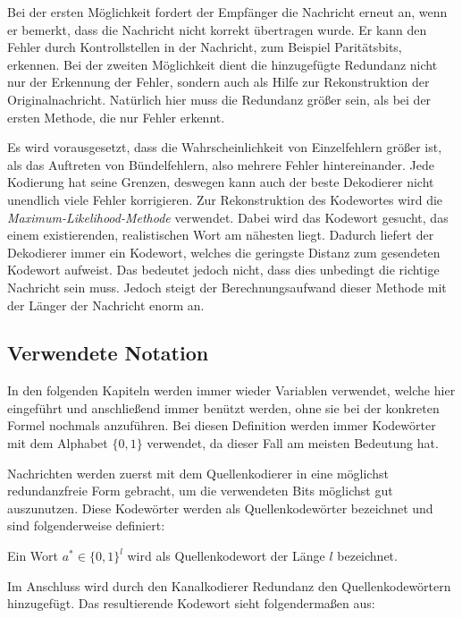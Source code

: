 Bei der ersten Möglichkeit fordert der Empfänger die Nachricht erneut an, wenn er bemerkt, dass die Nachricht nicht korrekt übertragen wurde. Er kann den Fehler durch Kontrollstellen in der Nachricht, zum Beispiel Paritätsbits, erkennen. Bei der zweiten Möglichkeit dient die hinzugefügte Redundanz nicht nur der Erkennung der Fehler, sondern auch als Hilfe zur Rekonstruktion der Originalnachricht. Natürlich hier muss die Redundanz größer sein, als bei der ersten Methode, die nur Fehler erkennt.

Es wird vorausgesetzt, dass die Wahrscheinlichkeit von Einzelfehlern größer ist, als das Auftreten von Bündelfehlern, also mehrere Fehler hintereinander. Jede Kodierung hat seine Grenzen, deswegen kann auch der beste Dekodierer nicht unendlich viele Fehler korrigieren. Zur Rekonstruktion des Kodewortes wird die \emph{Maximum-Likelihood-Methode} verwendet. Dabei wird das Kodewort gesucht, das einem existierenden, realistischen Wort am nähesten liegt. Dadurch liefert der Dekodierer immer ein Kodewort, welches die geringste Distanz zum gesendeten Kodewort aufweist. Das bedeutet jedoch nicht, dass dies unbedingt die richtige Nachricht sein muss. Jedoch steigt der Berechnungsaufwand dieser Methode mit der Länger der Nachricht enorm an.~\cite[126-129]{schoenfeld2012informations} 

\subsection{Verwendete Notation}
\label{sec:notation}
In den folgenden Kapiteln werden immer wieder Variablen verwendet, welche hier eingeführt und anschließend immer benützt werden, ohne sie bei der konkreten Formel nochmals anzuführen. Bei diesen Definition werden immer Kodewörter mit dem Alphabet $\{0,1\}$ verwendet, da dieser Fall am meisten Bedeutung hat.

Nachrichten werden zuerst mit dem Quellenkodierer in eine möglichst redundanzfreie Form gebracht, um die verwendeten Bits möglichst gut auszunutzen. Diese Kodewörter werden als Quellenkodewörter bezeichnet und sind folgenderweise definiert:

\begin{t_def}
Ein Wort $a^* \in \{0,1\}^l$ wird als Quellenkodewort der Länge $l$ bezeichnet.
\end{t_def}

Im Anschluss wird durch den Kanalkodierer Redundanz den Quellenkodewörtern hinzugefügt. Das resultierende Kodewort sieht folgendermaßen aus:

